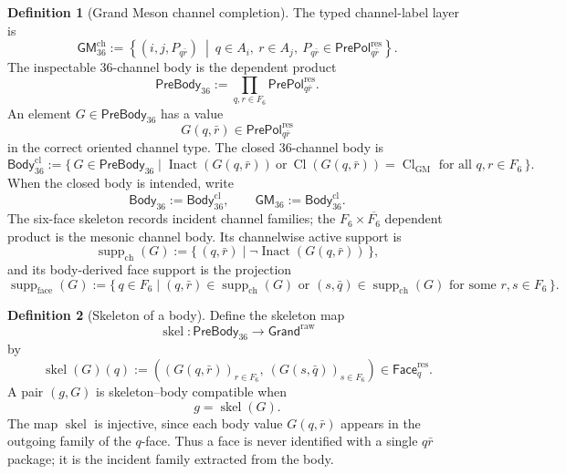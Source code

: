 \documentclass[11pt]{article}
\theoremstyle{definition}
\newtheorem{definition}{Definition}
\theoremstyle{plain}
\DeclareMathOperator{\supp}{supp}
\DeclareMathOperator{\Cl}{Cl}
\DeclareMathOperator{\skel}{skel}
\DeclareMathOperator{\Inact}{Inact}
\begin{document}
\begin{definition}[Grand Meson channel completion]
The typed channel-label layer is
\[
  \mathsf{GM}_{36}^{\mathrm{ch}}
  :=
  \left\{
    (i,j,P_{q\bar r})
    \ \middle|\
    q\in A_i,\ r\in A_j,\
    P_{q\bar r}\in\mathsf{PrePol}^{\mathrm{res}}_{q\bar r}
  \right\}.
\]
The inspectable \(36\)-channel body is the dependent product
\[
  \mathsf{PreBody}_{36}
  :=
  \prod_{q,r\in F_6}\mathsf{PrePol}^{\mathrm{res}}_{q\bar r}.
\]
An element \(G\in\mathsf{PreBody}_{36}\) has a value
\[
  G(q,\bar r)\in\mathsf{PrePol}^{\mathrm{res}}_{q\bar r}
\]
in the correct oriented channel type.  The closed \(36\)-channel body is
\[
  \mathsf{Body}_{36}^{\mathrm{cl}}
  :=
  \{\,G\in\mathsf{PreBody}_{36}\mid
  \Inact(G(q,\bar r))\ \text{or}\
  \Cl(G(q,\bar r))=\Cl_{\mathrm{GM}}
  \text{ for all }q,r\in F_6\,\}.
\]
When the closed body is intended, write
\[
  \mathsf{Body}_{36}:=\mathsf{Body}_{36}^{\mathrm{cl}},
  \qquad
  \mathsf{GM}_{36}:=\mathsf{Body}_{36}^{\mathrm{cl}}.
\]
The six-face skeleton records incident channel families; the
\(F_6\times\overline{F_6}\) dependent product is the mesonic channel body.
Its channelwise active support is
\[
  \supp_{\mathrm{ch}}(G)
  :=
  \{\,(q,\bar r)\mid \neg\Inact(G(q,\bar r))\,\},
\]
and its body-derived face support is the projection
\[
  \supp_{\mathrm{face}}(G)
  :=
  \{\,q\in F_6\mid
  (q,\bar r)\in\supp_{\mathrm{ch}}(G)
  \text{ or }(s,\bar q)\in\supp_{\mathrm{ch}}(G)
  \text{ for some }r,s\in F_6\,\}.
\]
\end{definition}

\begin{definition}[Skeleton of a body]
Define the skeleton map
\[
  \skel:\mathsf{PreBody}_{36}\longrightarrow\mathsf{Grand}^{\mathrm{raw}}
\]
by
\[
  \skel(G)(q)
  :=
  \left(
    (G(q,\bar r))_{r\in F_6},\
    (G(s,\bar q))_{s\in F_6}
  \right)
  \in\mathsf{Face}^{\mathrm{res}}_q.
\]
A pair \((g,G)\) is skeleton--body compatible when
\[
  g=\skel(G).
\]
The map \(\skel\) is injective, since each body value \(G(q,\bar r)\)
appears in the outgoing family of the \(q\)-face.  Thus a face is never
identified with a single \(q\bar r\) package; it is the incident family
extracted from the body.
\end{definition}
\end{document}
